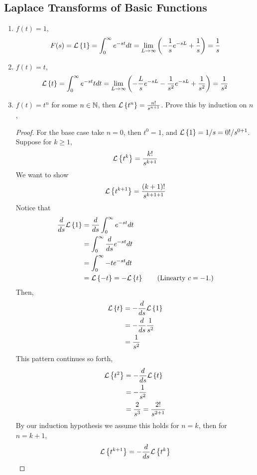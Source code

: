 \documentclass[openany]{report}
\begin{document}
\subsection{Laplace Transforms of Basic Functions}
\begin{enumerate}
    \item $f(t) = 1$, 
    \[F(s) = \mathcal{L}\left\{1\right\} = \int_0^\infty e^{-st}dt = \lim_{L\rightarrow \infty} \left(-\frac{1}{s}e^{-sL} + \frac{1}{s}\right) = \frac{1}{s}\]
    \item $f(t) = t$,
    \[\mathcal{L}\left\{t\right\} = \int_0^\infty e^{-st}tdt = \lim_{L\rightarrow\infty} \left(-\frac{L}{s}e^{-sL} - \frac{1}{s^2}e^{-sL} + \frac{1}{s^2}\right) = \frac{1}{s^2}\]
    \item $f(t) = t^n$ for some $n \in \mathbb{N}$, then $\mathcal{L}\left\{t^n\right\} = \frac{n!}{s^{n+1}}$. Prove this by induction on $n$, 
    \begin{proof}
        For the base case take $n = 0$, then $t^0 = 1$, and $\mathcal{L}\left\{1\right\} = 1/s = 0!/s^{0+1}$. Suppose for $k \geq 1$, 
        \[\mathcal{L}\left\{t^k\right\} = \frac{k!}{s^{k+1}}\]
        We want to show 
        \[\mathcal{L}\left\{t^{k+1}\right\} = \frac{(k+1)!}{s^{k+1 + 1}}\]
        Notice that
        \begin{align*}
            \frac{d}{ds}\mathcal{L}\left\{1\right\} &= \frac{d}{ds}\int_0^\infty e^{-st}dt\\
            &= \int_0^\infty \frac{d}{ds}e^{-st}dt\\
            &= \int_0^\infty -te^{-st}dt\\
            &= \mathcal{L}\left\{-t\right\} = -\mathcal{L}\left\{t\right\}\tag{Linearty $c = -1$.}
        \end{align*}
        Then, 
        \begin{align*}
            \mathcal{L}\left\{t\right\} &= - \frac{d}{ds}\mathcal{L}\left\{1\right\}\\
            &= -\frac{d}{ds}\frac{1}{s^2}\\
            &= \frac{1}{s^2}
        \end{align*}
        This pattern continues so forth, 
        \begin{align*}
            \mathcal{L}\left\{t^2\right\} &= -\frac{d}{ds}\mathcal{L}\left\{t\right\}\\
            &= - \frac{1}{s^2}\\
            &= \frac{2}{s^3} = \frac{2!}{s^{2 + 1}}
        \end{align*}
        By our induction hypothesis we assume this holds for $n = k$, then for $n = k+1$, 
        \begin{align*}
            \laplace{t^{k+1}} &= -\frac{d}{ds} \laplace{t^{k}}\\

\end{align*}
\end{proof}
\end{enumerate}
\end{document}

